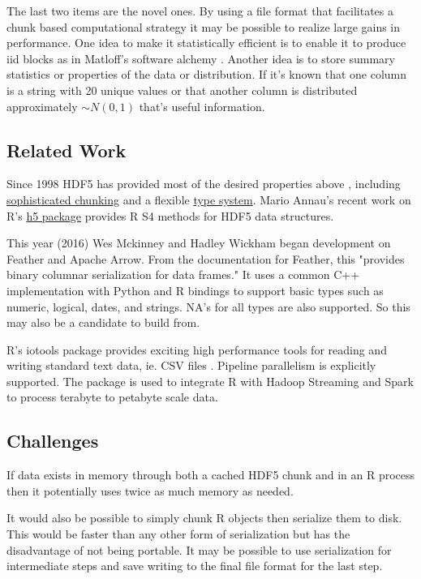 \documentclass[12pt]{article}
\begin{document}
The last two items are the novel ones. By using a file format
that facilitates a chunk based computational strategy it may be possible to
realize large gains in performance. One idea to make it statistically
efficient is to enable it to produce iid blocks as in Matloff's software
alchemy \cite{matloff2014software}. Another idea is to store summary
statistics or properties of the data or distribution. If it's known that
one column is a string with 20 unique values or that another column is
distributed approximately $\sim N(0, 1)$ that's useful information. 

\subsection{Related Work}

Since 1998 HDF5 has provided most of the desired properties above
\cite{hdf5}, including
\href{https://support.hdfgroup.org/HDF5/doc/Advanced/Chunking/}{sophisticated
chunking} and a flexible
\href{https://support.hdfgroup.org/HDF5/doc1.6/UG/11_Datatypes.html}{type system}.
Mario Annau's recent work on R's \href{https://github.com/mannau/h5}{h5
package} provides R S4 methods for HDF5 data structures.

This year (2016) Wes Mckinney and Hadley Wickham began development on Feather and
Apache Arrow. From the documentation for Feather, this "provides binary columnar
serialization for data frames." It uses a common C++ implementation with
Python and R bindings to support basic types such as numeric, logical,
dates, and strings. NA's for all types are also supported. So this may also
be a candidate to build from.

R's iotools package provides exciting high performance tools for reading
and writing standard text data, ie. CSV files \cite{arnold2015iotools}.
Pipeline parallelism is explicitly supported. The package is used to
integrate R with Hadoop Streaming and Spark to process terabyte to petabyte
scale data.

\subsection{Challenges}

If data exists in memory through both a cached HDF5 chunk and in an R process
then it potentially uses twice as much memory as needed.

It would also be possible to simply chunk R objects then serialize 
them to disk. This would be faster than any other form of serialization but
has the disadvantage of not being portable. It may be possible to use 
serialization for intermediate steps and save writing to the final file
format for the last step.
\end{document}
